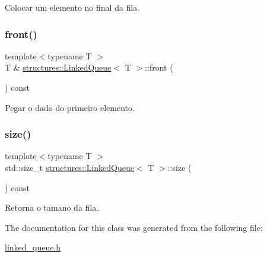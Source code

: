 Colocar um elemento no final da fila. 

\mbox{\label{classstructures_1_1LinkedQueue_a904219098f1f6b3aa229a8ea0f929b64}} 
\subsubsection{\texorpdfstring{front()}{front()}}
{\footnotesize\ttfamily template$<$typename T $>$ \\
T \& \hyperlink{classstructures_1_1LinkedQueue}{structures\+::\+Linked\+Queue}$<$ T $>$\+::front (\begin{DoxyParamCaption}{ }\end{DoxyParamCaption}) const}



Pegar o dado do primeiro elemento. 

\mbox{\label{classstructures_1_1LinkedQueue_ab86b0d95b796c277a21b89f106efd173}} 
\subsubsection{\texorpdfstring{size()}{size()}}
{\footnotesize\ttfamily template$<$typename T $>$ \\
std\+::size\+\_\+t \hyperlink{classstructures_1_1LinkedQueue}{structures\+::\+Linked\+Queue}$<$ T $>$\+::size (\begin{DoxyParamCaption}{ }\end{DoxyParamCaption}) const}



Retorna o tamano da fila. 



The documentation for this class was generated from the following file\+:\begin{DoxyCompactItemize}
\item 
\hyperlink{linked__queue_8h}{linked\+\_\+queue.\+h}\end{DoxyCompactItemize}
